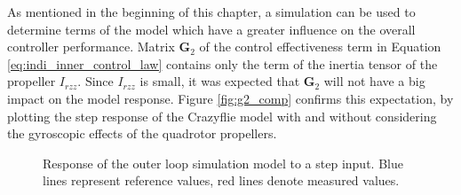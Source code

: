 \documentclass[11pt, a4paper, twoside]{report}
\begin{document}
As mentioned in the beginning of this chapter, a simulation can be used to determine terms of the model which have a greater influence on the overall controller performance. Matrix $\bm{G}_2$ of the control effectiveness term in Equation \ref{eq:indi_inner_control_law} contains only the term of the inertia tensor of the propeller $I_{rzz}$. Since $I_{rzz}$ is small, it was expected that $\bm{G}_2$ will not have a big impact on the model response. Figure \ref{fig:g2_comp} confirms this expectation, by plotting the step response of the Crazyflie model with and without considering  the gyroscopic effects of the quadrotor propellers. 
\begin{figure}[H]
	\centering 
	\captionsetup{justification=centering, singlelinecheck=off, font=bf, belowskip=-0.5cm}
	\caption[Response of the outer loop simulation model to a step input.]{Response of the outer loop simulation model to a step input. Blue lines represent reference values, red lines denote measured values.}
	\label{fig:sim_outer_all}
\end{figure}
\end{document}
